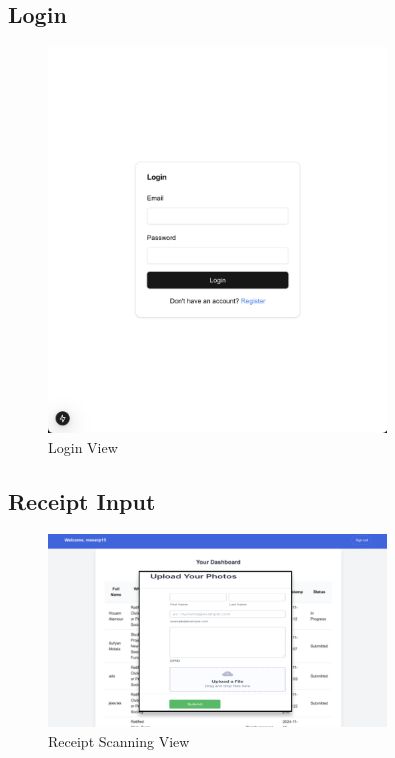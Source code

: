 \documentclass[12pt, titlepage]{article}
\begin{document}
\subsection{Login}
\begin{figure}[H]
    \centering
    \includegraphics[width=0.8\textwidth]{img/login.png}
    \caption{Login View}
    \label{fig:login}
\end{figure}

\subsection{Receipt Input}
\begin{figure}[H]
    \centering
    \includegraphics[width=0.8\textwidth]{img/upload.png}
    \caption{Receipt Scanning View}
    \label{fig:receipt}
\end{figure}
\end{document}
